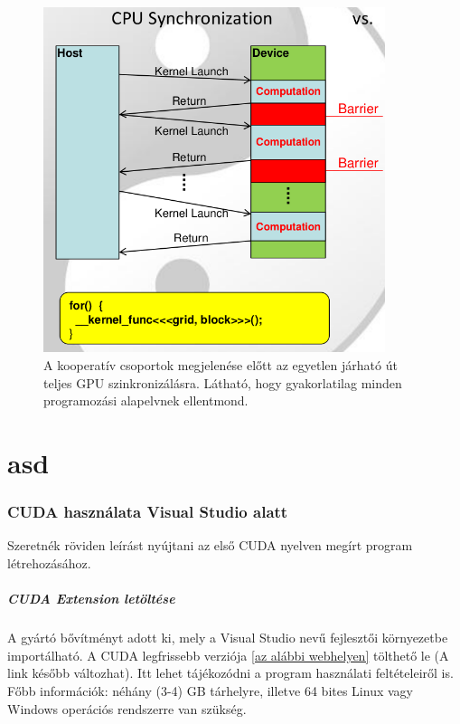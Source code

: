 \begin{figure}[ht!]
	\centering
	
	\includegraphics[width=100mm, keepaspectratio]{figures/Implicit synchronization.png}
	\caption{A kooperatív csoportok megjelenése előtt az egyetlen járható út teljes GPU szinkronizálásra. Látható, hogy gyakorlatilag minden programozási alapelvnek ellentmond.}
	\label{fig:Implicitsync}
\end{figure}

\chapter{asd}

\subsection{CUDA használata Visual Studio alatt}

Szeretnék röviden leírást nyújtani az első CUDA nyelven megírt program létrehozásához.

\paragraph{CUDA Extension letöltése}
A gyártó bővítményt adott ki, mely a Visual Studio nevű fejlesztői környezetbe importálható. A CUDA legfrissebb verziója \href{https://developer.nvidia.com/cuda-downloads}{[az alábbi webhelyen]} tölthető le (A link később változhat). Itt lehet tájékozódni a program használati feltételeiről is. Főbb információk: néhány (3-4) GB tárhelyre, illetve 64 bites Linux vagy Windows operációs rendszerre van szükség.

